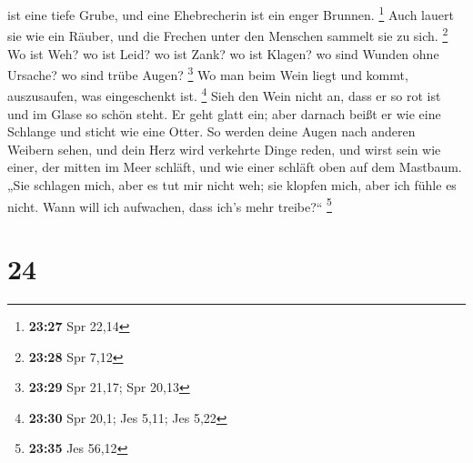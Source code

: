 ist eine tiefe Grube, und eine Ehebrecherin ist ein enger Brunnen.
\footnote{\textbf{23:27} Spr 22,14}  Auch lauert sie wie
ein Räuber, und die Frechen unter den Menschen sammelt sie zu sich.
\footnote{\textbf{23:28} Spr 7,12}  Wo ist Weh? wo ist
Leid? wo ist Zank? wo ist Klagen? wo sind Wunden ohne Ursache? wo sind
trübe Augen? \footnote{\textbf{23:29} Spr 21,17; Spr 20,13}
 Wo man beim Wein liegt und kommt, auszusaufen, was
eingeschenkt ist. \footnote{\textbf{23:30} Spr 20,1; Jes 5,11; Jes 5,22}
 Sieh den Wein nicht an, dass er so rot ist und im Glase
so schön steht. Er geht glatt ein;  aber darnach beißt er
wie eine Schlange und sticht wie eine Otter.  So werden
deine Augen nach anderen Weibern sehen, und dein Herz wird verkehrte
Dinge reden,  und wirst sein wie einer, der mitten im
Meer schläft, und wie einer schläft oben auf dem Mastbaum.
 „Sie schlagen mich, aber es tut mir nicht weh; sie
klopfen mich, aber ich fühle es nicht. Wann will ich aufwachen, dass
ich's mehr treibe?{}`` \footnote{\textbf{23:35} Jes 56,12}

\hypertarget{section-11}{%
\section{24}\label{section-11}}

